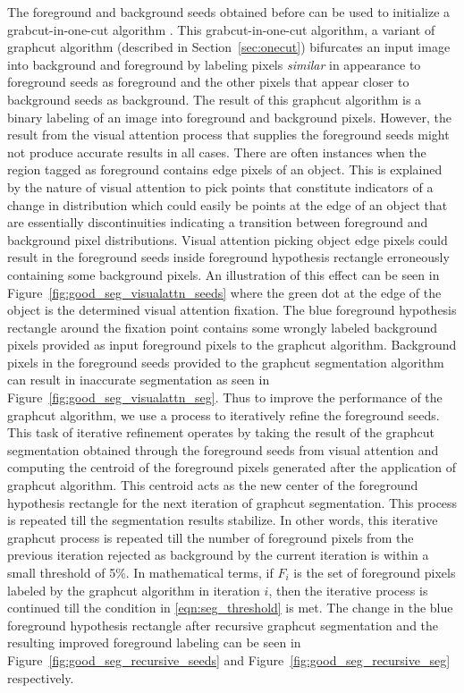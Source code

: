 \documentclass {udthesis}
\begin{document}
The foreground and background seeds obtained before can be used to initialize a grabcut-in-one-cut algorithm \cite{onecut}. This grabcut-in-one-cut algorithm, a variant of graphcut algorithm (described in Section~\ref{sec:onecut}) bifurcates an input image into background and foreground by labeling pixels \textit{similar} in appearance to foreground seeds as foreground and the other pixels that appear closer to background seeds as background. The result of this graphcut algorithm is a binary labeling of an image into foreground and background pixels. 
However, the result from the visual attention process that supplies the foreground seeds might not produce accurate results in all cases. There are often instances when the region tagged as foreground contains edge pixels of an object. This is explained by the nature of visual attention to pick points that constitute indicators of a change in distribution which could easily be points at the edge of an object that are essentially discontinuities indicating a transition between foreground and background pixel distributions. Visual attention picking object edge pixels could result in the foreground seeds inside foreground hypothesis rectangle erroneously containing some background pixels. An illustration of this effect can be seen in Figure~\ref{fig:good_seg_visualattn_seeds} where the green dot at the edge of the object is the determined visual attention fixation. The blue foreground hypothesis rectangle around the fixation point contains some wrongly labeled background pixels provided as input foreground 
pixels to the graphcut algorithm. Background pixels in the foreground seeds provided to the graphcut segmentation algorithm can result in inaccurate segmentation as seen in Figure~\ref{fig:good_seg_visualattn_seg}. Thus to improve the performance of the graphcut algorithm, we use a process to iteratively refine the foreground seeds. This task of iterative refinement operates by taking the result of the graphcut segmentation obtained through the foreground seeds from visual attention and computing the centroid of the foreground pixels generated after the application of graphcut algorithm. This centroid acts as the new center of the foreground hypothesis rectangle for the next iteration of graphcut segmentation. This process is repeated till the segmentation results stabilize. In other words, this iterative graphcut process is repeated 
till the number of foreground pixels from the previous iteration rejected as background by the current iteration is within a small threshold of 5\%. In mathematical terms, if $F_i$ is the set of foreground pixels labeled by the graphcut algorithm in iteration $i$, then the iterative process is continued till the condition in \eqref{eqn:seg_threshold} is met. The change in the blue foreground hypothesis rectangle after recursive graphcut segmentation and the resulting improved foreground labeling can be seen in Figure~\ref{fig:good_seg_recursive_seeds} and Figure~\ref{fig:good_seg_recursive_seg} respectively.
\end{document}

